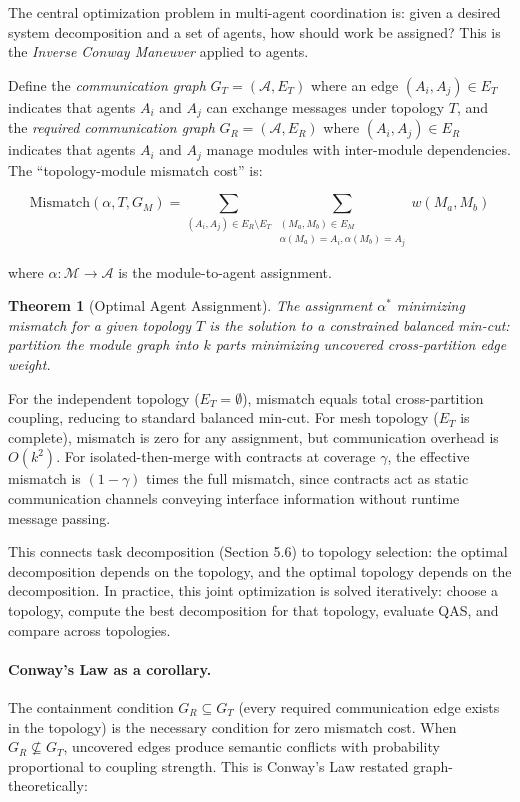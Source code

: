 \documentclass[11pt, a4paper, logo, copyright]{googledeepmind}
\newtheorem{theorem}{Theorem}[section]
\begin{document}
The central optimization problem in multi-agent coordination is: given a desired system decomposition and a set of agents, how should work be assigned? This is the \emph{Inverse Conway Maneuver} applied to agents.

Define the \emph{communication graph} $G_T = (\mathcal{A}, E_T)$ where an edge $(A_i, A_j) \in E_T$ indicates that agents $A_i$ and $A_j$ can exchange messages under topology $T$, and the \emph{required communication graph} $G_R = (\mathcal{A}, E_R)$ where $(A_i, A_j) \in E_R$ indicates that agents $A_i$ and $A_j$ manage modules with inter-module dependencies. The ``topology-module mismatch cost'' is:

\begin{equation}
    \mathrm{Mismatch}(\alpha, T, G_M) = \sum_{(A_i, A_j) \in E_R \setminus E_T} \sum_{\substack{(M_a, M_b) \in E_M \\ \alpha(M_a)=A_i, \alpha(M_b)=A_j}} w(M_a, M_b)
\end{equation}

where $\alpha: \mathcal{M} \to \mathcal{A}$ is the module-to-agent assignment.

\begin{theorem}[Optimal Agent Assignment]
\label{thm:inverse-conway}
The assignment $\alpha^*$ minimizing mismatch for a given topology $T$ is the solution to a constrained balanced min-cut: partition the module graph into $k$ parts minimizing uncovered cross-partition edge weight.
\end{theorem}

For the independent topology ($E_T = \emptyset$), mismatch equals total cross-partition coupling, reducing to standard balanced min-cut. For mesh topology ($E_T$ is complete), mismatch is zero for any assignment, but communication overhead is $O(k^2)$. For isolated-then-merge with contracts at coverage $\gamma$, the effective mismatch is $(1-\gamma)$ times the full mismatch, since contracts act as static communication channels conveying interface information without runtime message passing.

This connects task decomposition (Section 5.6) to topology selection: the optimal decomposition depends on the topology, and the optimal topology depends on the decomposition. In practice, this joint optimization is solved iteratively: choose a topology, compute the best decomposition for that topology, evaluate QAS, and compare across topologies.

\paragraph{Conway's Law as a corollary.} The containment condition $G_R \subseteq G_T$ (every required communication edge exists in the topology) is the necessary condition for zero mismatch cost. When $G_R \not\subseteq G_T$, uncovered edges produce semantic conflicts with probability proportional to coupling strength. This is Conway's Law \citep{conway1968} restated graph-theoretically:
\end{document}
